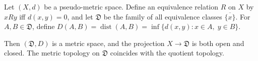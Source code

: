 Let $(X,d)$ be a pseudo-metric space. Define an equivalence relation $R$ on $X$ by $x R y$ iff $d(x,y) = 0$, and let $\mathfrak{D}$ be the family of all equivalence classes $\overline{\{x\}}$. For $A, B \in \mathfrak{D}$, define $D(A,B) = \operatorname{dist}(A,B) = \inf \{d(x,y) : x \in A,\; y \in B\}$.

Then $(\mathfrak{D}, D)$ is a metric space, and the projection $X \to \mathfrak{D}$ is both open and closed. The metric topology on $\mathfrak{D}$ coincides with the quotient topology.

